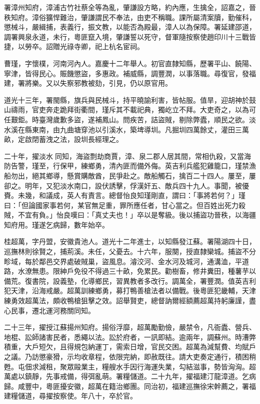 \begin{pinyinscope}
署漳州知府，漳浦古竹社蔡全等為亂，肇謙設方略，約內應，生擒全，詔嘉之，晉秩知府。漳俗獷悍難治，肇謙謂民不奉法，由吏不稱職。課所屬清案牘，勤催科，懲械斗，嚴緝捕，表義行，振文教，以能否為殿最，漳人以為保障。署延建邵道，調署興泉永道，未行，粵匪竄入境，肇謙誓以死守，督軍隨按察使趙印川十三戰皆捷，以勞卒。詔贈光祿寺卿，祀上杭名宦祠。

曹瑾，字懷樸，河南河內人。嘉慶十二年舉人。初官直隸知縣，歷署平山、饒陽、寧津，皆得民心。賑饑懲盜，多惠政。補威縣，調豐潤，以事落職。尋復官，發福建，署將樂。又以失察邪教被劾，引見，仍以原官用。

道光十三年，署閩縣，旗兵與民械斗，持平曉諭利害，皆帖服。值旱，迎胡神於鼓山禱雨，官吏奔走跪拜街衢間，瑾斥其不載祀典，獨屹立不拜。大吏奇之，以為可任艱鉅。時臺灣歲歉多盜，遂補鳳山。問疾苦，詰盜賊，剔除弊蠹，順民之欲。淡水溪在縣東南，由九曲塘穿池以引溪水，築埤導圳。凡掘圳四萬餘丈，灌田三萬畝，定啟閉蓄洩之法，設圳長經理之。

二十年，擢淡水同知，海盜剽劫商賈，漳、泉二郡人居其間，常相仇殺，又當海防告警，瑾至，行保甲，練鄉勇，清內匪而備外侮。英吉利兵艦犯雞籠口，瑾禁漁船勿出，絕其鄉導，懸賞購敵酋，民爭赴之。敵船觸石，擒百二十四人。屢至，屢卻之。明年，又犯淡水南口，設伏誘擊，俘漢奸五、敵兵四十九人。事聞，被優賚。未幾，和議成，英人有責言。總督怡良知瑾剛直，謂曰：「事將若何？」瑾曰：「但論國家事若何，某官無足重，罪所應任者，甘心當之。但百姓出死力殺賊，不宜有負。」怡良嘆曰：「真丈夫也！」卒以是奪級。後以捕盜功晉秩，以海疆知府用。瑾遂乞病歸，數年始卒。

桂超萬，字丹盟，安徽貴池人。道光十二年進士，以知縣發江蘇。署陽湖四十日，巡撫林則徐賢之，捕荊溪。未任，父憂去。十六年，服闋，授直隸欒城。捕盜不分畛域，每於鄰邑交界處破賊巢，盜風息。濬洨河、金水河及城河，通溝洫，平道路，水潦無患。限紳戶免役不得過三十畝，免累民。勸樹畜，修井糞田，種薯芋以備荒。復書院，設義塾，化導鄉民，習異教者多改行。調萬全，署豐潤。值英吉利犯天津，沿海戒嚴。超萬訓練鄉勇，募打鴨善槍法者以備戰。後粵匪犯畿輔，天津練勇效超萬法，頗收鴨槍狙擊之效。詔舉賢吏，總督訥爾經額薦超萬持躬廉謹，盡心民事，遷北運河務關同知。

二十三年，擢授江蘇揚州知府。揚俗浮靡，超萬勵勤儉，嚴禁令，凡衙蠹、營兵、地棍、訟師諸害民者，悉繩以法。訟於府者，一訊即結。逾兩年，調蘇州。時漕弊積重，大戶短欠，且得規包納運丁，需索日增，官民交困。超萬為減幫費、均賦戶之議。乃訪懲豪猾，示均收章程，依限完納，即赦既往。請大吏奏定通行，積困稍甦。屯佃求減租，聚眾毆業主，糧艘水手因行海運失業，勾結滋事，勢皆洶洶。超萬處以鎮靜，先事戒備，得弭亂萌。署糧儲道。二十九年，擢福建汀龍漳道。乞病歸。咸豐中，粵匪擾安徽，超萬在籍治鄉團。同治初，福建巡撫徐宋幹薦之，署福建糧儲道，尋擢按察使。年八十，卒於官。


\end{pinyinscope}
